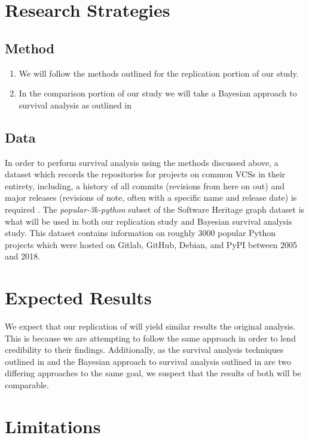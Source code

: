 \documentclass[conference]{IEEEtran}
\begin{document}

\section{Research Strategies}

\subsection{Method}

\begin{enumerate}
    \item We will follow the methods outlined \cite{ali2020cheating} for the replication portion of our study.
    \item In the comparison portion of our study we will take a Bayesian approach to survival analysis as outlined in \cite{kelter2020bayesian}
\end{enumerate}

\subsection{Data}

In order to perform survival analysis using the methods discussed above, a dataset which records the repositories for projects on common VCSs in their entirety, including, a history of all commits (revisions from here on out) and major releases (revisions of note, often with a specific name and release date) is required \cite{ali2020cheating}. The \emph{popular-3k-python} subset of the Software Heritage graph dataset \cite{pietri2019software} is what will be used in both our replication study and Bayesian survival analysis study. This dataset contains information on roughly 3000 popular Python projects which were hosted on Gitlab, GitHub, Debian, and PyPI between 2005 and 2018.

\section{Expected Results}

We expect that our replication of \cite{ali2020cheating} will yield similar results the original analysis. This is because we are attempting to follow the same approach in order to lend credibility to their findings. Additionally, as the survival analysis techniques outlined in \cite{ali2020cheating} and the Bayesian approach to survival analysis outlined in \cite{kelter2020bayesian} are two differing approaches to the same goal, we suspect that the results of both will be comparable.

\section{Limitations}




\end{document}
